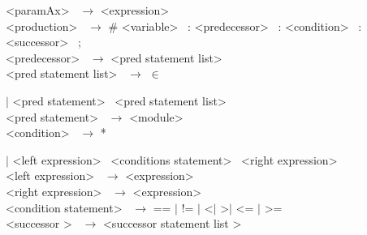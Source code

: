 \noindent
\textless paramAx\textgreater~ $\rightarrow$ \textless expression\textgreater~ \\



\noindent
\textless production\textgreater~ $\rightarrow$  \# \textless variable\textgreater~  : \textless predecessor\textgreater~ : \textless condition\textgreater~  : \textless successor\textgreater~ ;\\



\noindent
\textless predecessor\textgreater~ $\rightarrow$ \textless pred statement list\textgreater~ \\


\noindent
\textless pred statement list\textgreater~ $\rightarrow$ $\in$

\hspace{2cm} $|$ \textless pred statement\textgreater~ \textless pred statement list\textgreater~ \\


\noindent
\textless pred statement\textgreater~ $\rightarrow$ \textless module\textgreater~ \\



\noindent
\textless condition\textgreater~ $\rightarrow$ *

\hspace{2cm} $|$ \textless left expression\textgreater~ \textless conditions statement\textgreater~ \textless right expression\textgreater~ \\


\noindent
\textless left expression\textgreater~ $\rightarrow$ \textless expression\textgreater~ \\


\noindent
\textless right expression\textgreater~ $\rightarrow$ \textless expression\textgreater~ \\


\noindent
\textless condition statement\textgreater~ $\rightarrow$ == $|$ != $|$ \textless $|$ \textgreater $|$ \textless = $|$ \textgreater =\\



\noindent
\textless successor \textgreater~ $\rightarrow$ \textless successor statement list \textgreater~ \\


